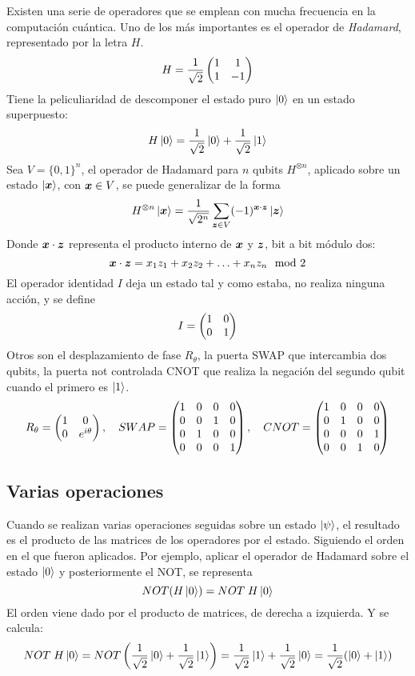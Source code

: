 Existen una serie de operadores que se emplean con mucha frecuencia en la 
computación cuántica. Uno de los más importantes es el operador de 
\textit{Hadamard}, representado por la letra $H$.
%
$$ H = \frac{1}{\sqrt 2} \begin{pmatrix} 1 & 1 \\ 1 & -1 \end{pmatrix} $$
%
Tiene la peliculiaridad de descomponer el estado puro $\ket{0}$ en un estado 
superpuesto:
%
$$ H \ket{0} = \frac{1}{\sqrt 2}\ket{0} + \frac{1}{\sqrt 2}\ket{1} $$
%
Sea $V =  \{0,1\}^n$, el operador de Hadamard para $n$ qubits $H^{\otimes n}$, 
aplicado sobre un estado $\ket{\boldsymbol{x}}$, con $\boldsymbol{x} \in V$, se puede generalizar de 
la forma
%
$$ H^{\otimes n} \ket{\boldsymbol{x}} = \frac 1 {\sqrt {2^n}} \sum_{\boldsymbol{z} \in V} (-1)^{\boldsymbol{x} 
\cdot \boldsymbol{z}} \ket{\boldsymbol{z}}$$
%
Donde $\boldsymbol{x} \cdot \boldsymbol{z}$ representa el producto interno de $\boldsymbol{x}$ y $\boldsymbol{z}$, bit a 
bit módulo dos:
%
$$ \boldsymbol{x} \cdot \boldsymbol{z} = x_1 z_1 + x_2 z_2 + \ldots + x_n z_n \mod 2$$
%
El operador identidad $I$ deja un estado tal y como estaba, no realiza ninguna 
acción, y se define
%
$$ I = \begin{pmatrix} 1&0 \\ 0&1 \end{pmatrix}$$
%
Otros son el desplazamiento de fase $R_\theta$, la puerta SWAP que intercambia 
dos qubits, la puerta not controlada CNOT que realiza la negación del segundo 
qubit cuando el primero es $\ket{1}$.
$$ R_\theta = \begin{pmatrix} 1 & 0 \\ 0 & e^{i\theta} \end{pmatrix}, \quad
SWAP = \begin{pmatrix} 1&0&0&0 \\ 0&0&1&0 \\ 0&1&0&0 \\ 0&0&0&1 \end{pmatrix}, \quad
CNOT = \begin{pmatrix} 1&0&0&0 \\ 0&1&0&0 \\ 0&0&0&1 \\ 0&0&1&0 \end{pmatrix}
$$


\subsection{Varias operaciones}

Cuando se realizan varias operaciones seguidas sobre un estado $\ket{\psi}$, el 
resultado es el producto de las matrices de los operadores por el estado.  
Siguiendo el orden en el que fueron aplicados. Por ejemplo, aplicar el operador 
de Hadamard sobre el estado $\ket{0}$ y posteriormente el NOT, se representa
%
$$ NOT(H\ket{0}) = NOT\; H \ket{0} $$
%
El orden viene dado por el producto de matrices, de derecha a izquierda. Y se 
calcula:
%
$$ NOT\; H \ket{0} = NOT\left(\frac{1}{\sqrt 2}\ket{0} + \frac{1}{\sqrt 
2}\ket{1}\right) =
\frac{1}{\sqrt 2}\ket{1} + \frac{1}{\sqrt 2}\ket{0} = \frac{1}{\sqrt 2}(\ket{0} 
+ \ket{1}) $$

